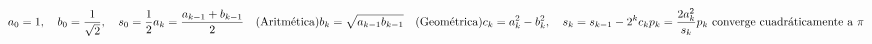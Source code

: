 \documentclass[preview]{standalone}
\begin{document}
\begin{align*}
a_0 = 1, \quad b_0 = \frac{1}{\sqrt{2}}, \quad s_0 = \frac{1}{2}
a_k = \frac{a_{k-1} + b_{k-1}}{2} \quad (\text{Aritmética})
b_k = \sqrt{a_{k-1} b_{k-1}} \quad (\text{Geométrica})
c_k = a_k^2 - b_k^2, \quad s_k = s_{k-1} - 2^k c_k
p_k = \frac{2 a_k^2}{s_k}
\newline
p_k \text{ converge cuadráticamente a } \pi
\end{align*}
\end{document}
